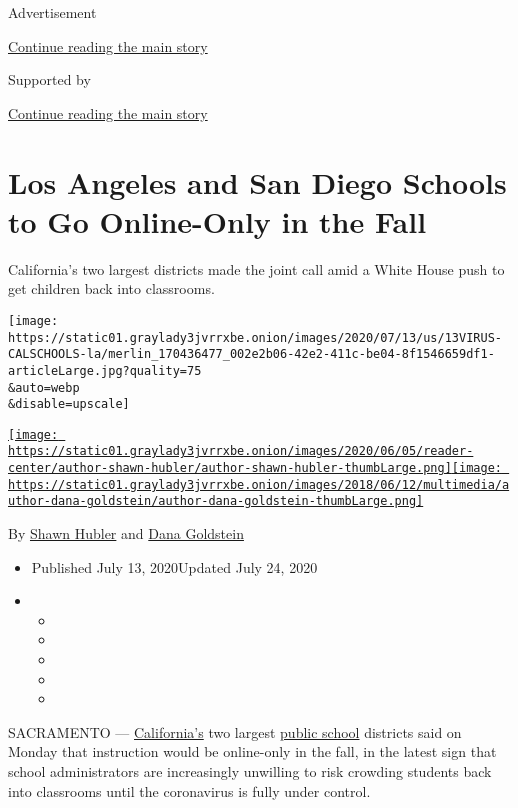 Advertisement

\protect\hyperlink{after-top}{Continue reading the main story}

Supported by

\protect\hyperlink{after-sponsor}{Continue reading the main story}

\hypertarget{los-angeles-and-san-diego-schools-to-go-online-only-in-the-fall}{%
\section{Los Angeles and San Diego Schools to Go Online-Only in the
Fall}\label{los-angeles-and-san-diego-schools-to-go-online-only-in-the-fall}}

California's two largest districts made the joint call amid a White
House push to get children back into classrooms.

\texttt{[image: https://static01.graylady3jvrrxbe.onion/images/2020/07/13/us/13VIRUS-CALSCHOOLS-la/merlin\_170436477\_002e2b06-42e2-411c-be04-8f1546659df1-articleLarge.jpg?quality=75\\\&auto=webp\\\&disable=upscale]}

\href{https://www.nytimes3xbfgragh.onion/by/shawn-hubler}{\texttt{[image: https://static01.graylady3jvrrxbe.onion/images/2020/06/05/reader-center/author-shawn-hubler/author-shawn-hubler-thumbLarge.png]}}\href{https://www.nytimes3xbfgragh.onion/by/dana-goldstein}{\texttt{[image: https://static01.graylady3jvrrxbe.onion/images/2018/06/12/multimedia/author-dana-goldstein/author-dana-goldstein-thumbLarge.png]}}

By \href{https://www.nytimes3xbfgragh.onion/by/shawn-hubler}{Shawn
Hubler} and
\href{https://www.nytimes3xbfgragh.onion/by/dana-goldstein}{Dana
Goldstein}

\begin{itemize}
\item
  Published July 13, 2020Updated July 24, 2020
\item
  \begin{itemize}
  \item
  \item
  \item
  \item
  \item
  \end{itemize}
\end{itemize}

SACRAMENTO ---
\href{https://www.nytimes3xbfgragh.onion/2020/07/24/us/ca-schools-reopening.html}{California's}
two largest
\href{https://www.nytimes3xbfgragh.onion/2020/07/24/us/ca-schools-reopening.html}{public
school} districts said on Monday that instruction would be online-only
in the fall, in the latest sign that school administrators are
increasingly unwilling to risk crowding students back into classrooms
until the coronavirus is fully under control.

